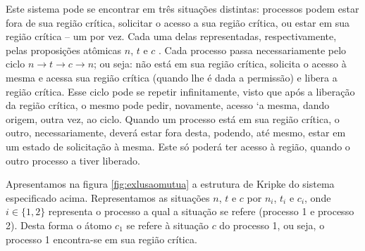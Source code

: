 \documentclass[normaltoc,capchap,capsec,times]{abnt}
\begin{document}
Este sistema pode se encontrar em três situações distintas: processos podem estar fora de sua região crítica, solicitar o acesso a sua região crítica, ou estar em sua região crítica -- um por vez. Cada uma delas representadas, respectivamente, pelas proposições atômicas $n$, $t$ e $c$ . Cada processo passa necessariamente pelo ciclo $n \to t \to c \to n$; ou seja: não está em sua região crítica, solicita o acesso à mesma e acessa sua região crítica (quando lhe é dada a permissão) e libera a região crítica. Esse ciclo pode se repetir infinitamente, visto que após a liberação da região crítica, o mesmo pode pedir, novamente, acesso `a mesma, dando origem, outra vez, ao ciclo. Quando um processo está em sua região crítica, o outro, necessariamente, deverá estar fora desta, podendo, até mesmo, estar em um estado de solicitação à mesma. Este só poderá ter acesso à região, quando o outro processo a tiver liberado.\cite{huth}

Apresentamos na figura \ref{fig:exlusaomutua} a estrutura de Kripke do sistema especificado acima. Representamos as situações  $n$, $t$ e $c$ por $n_i$, $t_i$ e $c_i$, onde $i \in \{1,2\}$ representa o processo a qual a situação se refere (processo 1 e processo 2). Desta forma o átomo $c_1$ se refere à situação $c$ do processo 1, ou seja, o processo 1 encontra-se em sua região crítica.
\end{document}
